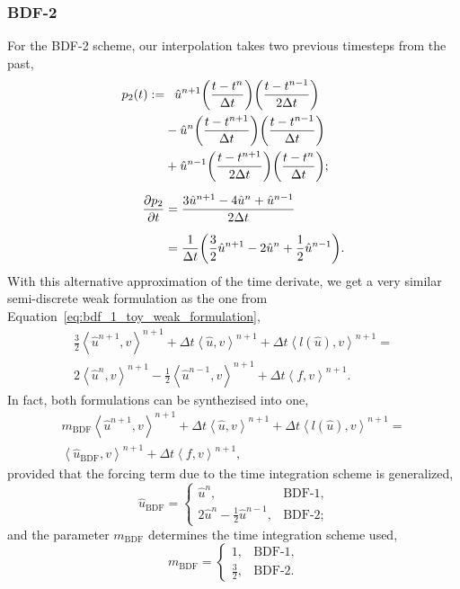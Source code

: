 \documentclass[../../thesis.tex]{subfiles}
\newcommand{\inner}[2]{\left<#1, #2\right>}
\newcommand{\dt}{\ensuremath{\Delta t}}
\begin{document}
\subsubsection{BDF-2}
For the BDF-2 scheme,
our interpolation takes two previous timesteps from the past,
\begin{subequations}
\begin{align}
    p_2(t) 
    := 
    &\phantom{+}\hat{u}^{n+1}
    \qty(\frac{t-t^{n}}{\dt})
    \qty(\frac{t-t^{n-1}}{2\dt})
    \nonumber \\
    &-
    \hat{u}^{n}
    \qty(\frac{t-t^{n+1}}{\dt})
    \qty(\frac{t-t^{n-1}}{\dt}) 
    \nonumber \\
    &+
    \hat{u}^{n-1}
    \qty(\frac{t-t^{n+1}}{2\dt})
    \qty(\frac{t-t^{n}}{\dt});
    \\[2mm]
    \pdv{p_2}{t} 
    &= 
    \frac{3\hat{u}^{n+1} - 4\hat{u}^{n} + \hat{u}^{n-1}}{2\dt}
    \nonumber 
    \\[2mm]
    &= \frac{1}{\dt}
    \qty(
        \frac{3}{2}\hat{u}^{n+1} 
        - 2\hat{u}^{n} 
        + \frac{1}{2}\hat{u}^{n-1}
        ).
    \end{align}
\end{subequations}
With this alternative approximation of the time derivate, 
we get a very similar semi-discrete weak formulation as the one 
from Equation~\eqref{eq:bdf_1_toy_weak_formulation},
\begin{align}
    \frac{3}{2}\inner{\hat{u}^{n+1}}{v}^{n+1}
    + \dt \inner{\hat{u}}{v}^{n+1}
    + \dt \inner{l(\hat{u})}{v}^{n+1}
    =
    \nonumber \\
    2            \inner{\hat{u}^{n}  }{v}^{n+1}
    - \frac{1}{2}\inner{\hat{u}^{n-1}}{v}^{n+1}
    + 
    \dt \inner{f}{v}^{n+1}.
    \label{eq:bdf_2_toy_weak_formulation}
\end{align}
In fact, both formulations can be synthezised into one,
\begin{align}
    m_{\text{BDF}}\inner{\hat{u}^{n+1}}{v}^{n+1}
    + \dt \inner{\hat{u}}{v}^{n+1}
    + \dt \inner{l(\hat{u})}{v}^{n+1}
    =
    \nonumber 
    \\[2mm]
    \inner{\hat{u}_{\text{BDF}}  }{v}^{n+1}
    + 
    \dt \inner{f}{v}^{n+1},
    \label{eq:weak_formulation_generalized_bdf}
\end{align}
provided that the forcing term due to the time integration scheme is generalized,
\begin{equation}
    \hat{u}_{\text{BDF}} =
    \begin{cases}
        \hat{u}^{n}, &\text{BDF-1},
        \\    
        2\hat{u}^{n} 
        -\frac{1}{2}\hat{u}^{n-1}, &\text{BDF-2};
    \end{cases}
    \label{eq:bdf_forcing_term_generalization}
\end{equation}
and the parameter $m_{\text{BDF}}$ determines the time integration scheme used,
\begin{equation}
    m_{\text{BDF}} = 
    \begin{cases}
    1, &\text{BDF-1},
    \\    
    \frac{3}{2}, &\text{BDF-2}.
    \end{cases}
\end{equation}
\end{document}
